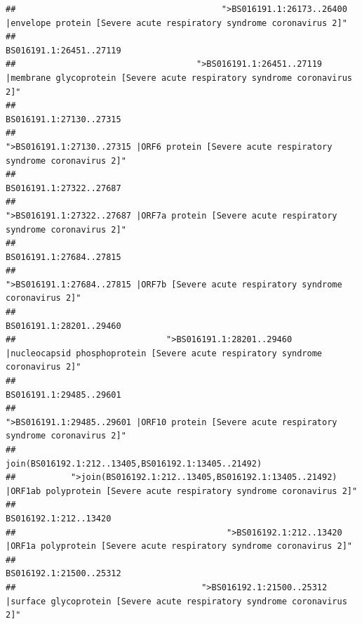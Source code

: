 \documentclass[
]{article}
\begin{document}
\begin{verbatim}
##                                         ">BS016191.1:26173..26400 |envelope protein [Severe acute respiratory syndrome coronavirus 2]" 
##                                                                                                                BS016191.1:26451..27119 
##                                    ">BS016191.1:26451..27119 |membrane glycoprotein [Severe acute respiratory syndrome coronavirus 2]" 
##                                                                                                                BS016191.1:27130..27315 
##                                             ">BS016191.1:27130..27315 |ORF6 protein [Severe acute respiratory syndrome coronavirus 2]" 
##                                                                                                                BS016191.1:27322..27687 
##                                            ">BS016191.1:27322..27687 |ORF7a protein [Severe acute respiratory syndrome coronavirus 2]" 
##                                                                                                                BS016191.1:27684..27815 
##                                                    ">BS016191.1:27684..27815 |ORF7b [Severe acute respiratory syndrome coronavirus 2]" 
##                                                                                                                BS016191.1:28201..29460 
##                              ">BS016191.1:28201..29460 |nucleocapsid phosphoprotein [Severe acute respiratory syndrome coronavirus 2]" 
##                                                                                                                BS016191.1:29485..29601 
##                                            ">BS016191.1:29485..29601 |ORF10 protein [Severe acute respiratory syndrome coronavirus 2]" 
##                                                                                    join(BS016192.1:212..13405,BS016192.1:13405..21492) 
##           ">join(BS016192.1:212..13405,BS016192.1:13405..21492) |ORF1ab polyprotein [Severe acute respiratory syndrome coronavirus 2]" 
##                                                                                                                  BS016192.1:212..13420 
##                                          ">BS016192.1:212..13420 |ORF1a polyprotein [Severe acute respiratory syndrome coronavirus 2]" 
##                                                                                                                BS016192.1:21500..25312 
##                                     ">BS016192.1:21500..25312 |surface glycoprotein [Severe acute respiratory syndrome coronavirus 2]" 

\end{verbatim}
\end{document}
